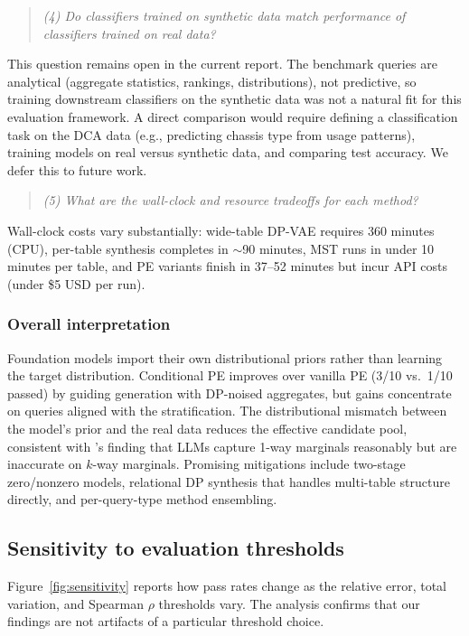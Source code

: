 \documentclass[12pt,letterpaper]{article}
\renewcommand{\_}{\textunderscore\allowbreak}
\begin{document}
\begin{quote}
\textit{(4) Do classifiers trained on synthetic data match performance of classifiers trained on real data?}
\end{quote}

This question remains open in the current report. The benchmark queries are analytical (aggregate statistics, rankings, distributions), not predictive, so training downstream classifiers on the synthetic data was not a natural fit for this evaluation framework. A direct comparison would require defining a classification task on the DCA data (e.g., predicting chassis type from usage patterns), training models on real versus synthetic data, and comparing test accuracy. We defer this to future work.

\begin{quote}
\textit{(5) What are the wall-clock and resource tradeoffs for each method?}
\end{quote}

Wall-clock costs vary substantially: wide-table DP-VAE requires 360 minutes (CPU), per-table synthesis completes in $\sim$90 minutes, MST runs in under 10 minutes per table, and PE variants finish in 37--52 minutes but incur API costs (under \$5 USD per run).

\subsubsection{Overall interpretation}

Foundation models import their own distributional priors rather than learning the target distribution. Conditional PE improves over vanilla PE (3/10 vs.\ 1/10 passed) by guiding generation with DP-noised aggregates, but gains concentrate on queries aligned with the stratification. The distributional mismatch between the model's prior and the real data reduces the effective candidate pool, consistent with \citeauthor{swanberg2025apiaccessllmsuseful}'s finding that LLMs capture 1-way marginals reasonably but are inaccurate on $k$-way marginals. Promising mitigations include two-stage zero/nonzero models, relational DP synthesis that handles multi-table structure directly, and per-query-type method ensembling.

\subsection{Sensitivity to evaluation thresholds}

Figure~\ref{fig:sensitivity} reports how pass rates change as the relative error, total variation, and Spearman $\rho$ thresholds vary. The analysis confirms that our findings are not artifacts of a particular threshold choice.
\end{document}
